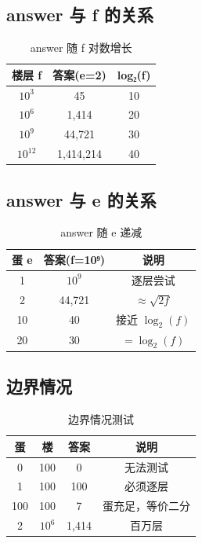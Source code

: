 \documentclass[12pt,a4paper]{article}
\begin{document}
\subsection*{answer 与 f 的关系}

\begin{table}[H]
\centering
\caption{answer 随 f 对数增长}
\begin{tabular}{@{}ccc@{}}
\toprule
\textbf{楼层 f} & \textbf{答案(e=2)} & \textbf{log₂(f)} \\
\midrule
$10^3$ & 45 & 10 \\
$10^6$ & 1,414 & 20 \\
$10^9$ & 44,721 & 30 \\
$10^{12}$ & 1,414,214 & 40 \\
\bottomrule
\end{tabular}
\end{table}

\subsection*{answer 与 e 的关系}

\begin{table}[H]
\centering
\caption{answer 随 e 递减}
\begin{tabular}{@{}ccc@{}}
\toprule
\textbf{蛋 e} & \textbf{答案(f=10⁹)} & \textbf{说明} \\
\midrule
1 & $10^9$ & 逐层尝试 \\
2 & 44,721 & $\approx \sqrt{2f}$ \\
10 & 40 & 接近 $\log_2(f)$ \\
20 & 30 & $= \log_2(f)$ \\
\bottomrule
\end{tabular}
\end{table}

\subsection*{边界情况}

\begin{table}[H]
\centering
\caption{边界情况测试}
\begin{tabular}{@{}cccc@{}}
\toprule
\textbf{蛋} & \textbf{楼} & \textbf{答案} & \textbf{说明} \\
\midrule
0 & 100 & 0 & 无法测试 \\
1 & 100 & 100 & 必须逐层 \\
100 & 100 & 7 & 蛋充足，等价二分 \\
2 & $10^6$ & 1,414 & 百万层 \\
\bottomrule
\end{tabular}
\end{table}
\end{document}
